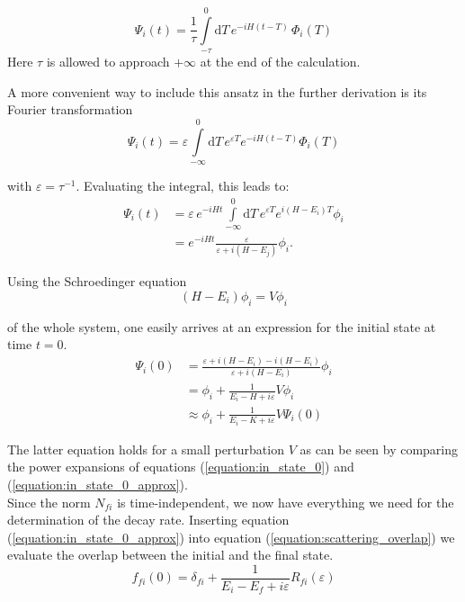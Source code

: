 \begin{equation}
  \Psi_i(t) = \frac 1\tau \int\limits_{-\tau}^0 \mathrm{d}T \,
              e^{-iH(t-T)} \, \Phi_i(T)
\end{equation}
Here $\tau$ is allowed to approach $+\infty$ at the end of the calculation.

A more convenient way to include this ansatz in the further derivation
is its Fourier transformation
\begin{equation}
  \Psi_i(t) = \varepsilon \int\limits_{-\infty}^0 \mathrm{d}T \,
              e^{\varepsilon T} e^{-iH(t-T)} \Phi_i(T)
\end{equation}

with $\varepsilon = \tau^{-1}$. Evaluating the integral, this leads to:
\begin{align}
   \Psi_i(t) &= \varepsilon \, e^{-iHt} \int\limits_{-\infty}^0 \mathrm{d}T \,
                e^{\varepsilon T} e^{i(H-E_i)T} \phi_i\\
             &= e^{-iHt} \frac{\varepsilon}{\varepsilon+i(H-E_j)} \phi_i .
\end{align}

Using the Schroedinger equation
\begin{equation}
  (H-E_i) \phi_i = V \phi_i
\end{equation}

of the whole system, one easily arrives at an expression for the initial state
at time $t=0$.
\begin{align}
  \Psi_i(0) &= \frac{\varepsilon + i(H-E_i) - i(H-E_i)}{\varepsilon + i(H-E_i)} \phi_i\\
            &= \phi_i + \frac{1}{E_i-H+i\varepsilon} V \phi_i \label{equation:in_state_0}\\
            &\approx \phi_i + \frac{1}{E_i-K+i\varepsilon} V \Psi_i(0) \label{equation:in_state_0_approx}
\end{align}

The latter equation holds for a small perturbation $V$ as can be seen by comparing
the power expansions of equations (\ref{equation:in_state_0}) and
(\ref{equation:in_state_0_approx}).\\
Since the norm $N_{fi}$ is time-independent, we now have
everything we need for the determination of the decay rate.
Inserting equation (\ref{equation:in_state_0_approx}) into equation
(\ref{equation:scattering_overlap}) we evaluate the overlap between the initial
and the final state.
\begin{equation}
  f_{fi}(0) = \delta_{fi} + \frac{1}{E_i-E_f+i\varepsilon} R_{fi}(\varepsilon)
\end{equation}

